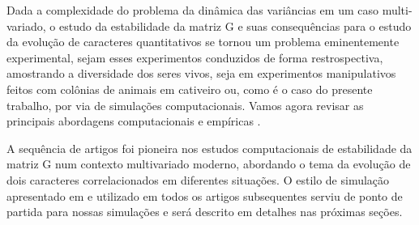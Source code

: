 Dada a complexidade do problema da dinâmica das variâncias em um caso
multi-variado, o estudo da estabilidade da matriz G e suas consequências
para o estudo da evolução de caracteres quantitativos se tornou um
problema eminentemente experimental, sejam esses experimentos conduzidos
de forma restrospectiva, amostrando a diversidade dos seres vivos, seja
em experimentos manipulativos feitos com colônias de animais em
cativeiro ou, como é o caso do presente trabalho, por via de simulações
computacionais. 
Vamos agora revisar as principais abordagens computacionais e empíricas
.

A sequência de artigos \cite{Jones2003, Jones2004, Jones2007} foi
pioneira nos estudos computacionais de estabilidade da matriz G num
contexto multivariado moderno, abordando o tema da evolução de dois
caracteres correlacionados em diferentes situações. 
O estilo de simulação apresentado em \cite{Jones2003} e utilizado em
todos os artigos subsequentes serviu de ponto de partida para nossas
simulações e será descrito em detalhes nas próximas seções.

